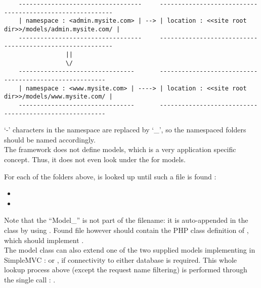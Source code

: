 \documentclass[pdftex,12pt,a4paper]{article}
\begin{document}
\begin{center}
\begin{unbreakable}
{\scriptsize
\begin{verbatim}
	----------------------------------     ---------------------------------------------------------
	| namespace : <admin.mysite.com> | --> | location : <<site root dir>>/models/admin.mysite.com/ |
	----------------------------------     ---------------------------------------------------------
	             ||
	             \/
	--------------------------------       -------------------------------------------------------
	| namespace : <www.mysite.com> | ----> | location : <<site root dir>>/models/www.mysite.com/ |
	--------------------------------       -------------------------------------------------------
\end{verbatim}
}
\end{unbreakable}
\end{center}
\begin{note}
`-' characters in the namespace are replaced by `\_', so the namespaced folders should be named accordingly.\\
The framework does not define models, which is a very application specific concept. Thus, it does not even look under the  for models.
\end{note}

For each of the folders above,  is looked up until such a file is found :
\begin{itemize}
	\item {}
	\item {}
\end{itemize}

Note that the ``Model\_'' is not part of the filename: it is auto-appended in the  class by using .
Found file however should contain the PHP class definition of , which should implement .\\
The model class can also extend one of the two supplied models implementing  in SimpleMVC :  or , if connectivity to either database is required.
This whole lookup process above (except the request name filtering) is performed through the single call : .
\end{document}
